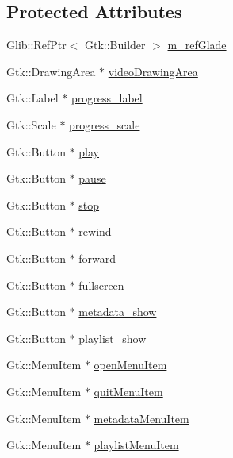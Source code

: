 \subsection*{Protected Attributes}
\begin{DoxyCompactItemize}
\item 
Glib\-::\-Ref\-Ptr$<$ Gtk\-::\-Builder $>$ \hyperlink{classplayerWindow_aec50c582b518c3ec9c4c86dde1a94127}{m\-\_\-ref\-Glade}
\item 
Gtk\-::\-Drawing\-Area $\ast$ \hyperlink{classplayerWindow_a86cf18b2dd54a8b7c48d012134dc2947}{video\-Drawing\-Area}
\item 
Gtk\-::\-Label $\ast$ \hyperlink{classplayerWindow_ae276969a34d7a21553c23ae17ca76eca}{progress\-\_\-label}
\item 
Gtk\-::\-Scale $\ast$ \hyperlink{classplayerWindow_a295a659d7e32496d0fc278afeed2f7d1}{progress\-\_\-scale}
\item 
Gtk\-::\-Button $\ast$ \hyperlink{classplayerWindow_a81cfbb843e2371f1b9bfb8c05dd4b56b}{play}
\item 
Gtk\-::\-Button $\ast$ \hyperlink{classplayerWindow_aeb53d8b331ccfaba331014ff31906900}{pause}
\item 
Gtk\-::\-Button $\ast$ \hyperlink{classplayerWindow_a45301ae61e21b660c836900e8c0155f6}{stop}
\item 
Gtk\-::\-Button $\ast$ \hyperlink{classplayerWindow_aa32c5da9a017455284386fdc32ab82b4}{rewind}
\item 
Gtk\-::\-Button $\ast$ \hyperlink{classplayerWindow_acbb28791ab52cec384ca908fb2574260}{forward}
\item 
Gtk\-::\-Button $\ast$ \hyperlink{classplayerWindow_a3da94085afe63001f55c12338710fa2c}{fullscreen}
\item 
Gtk\-::\-Button $\ast$ \hyperlink{classplayerWindow_a4d2470ce86d3ec380fd0cb4aac3a7ae8}{metadata\-\_\-show}
\item 
Gtk\-::\-Button $\ast$ \hyperlink{classplayerWindow_a6eb8371f71ff2dd2b9e6df87577b5c3f}{playlist\-\_\-show}
\item 
Gtk\-::\-Menu\-Item $\ast$ \hyperlink{classplayerWindow_a01aafd36eea007874231bfac245dd21d}{open\-Menu\-Item}
\item 
Gtk\-::\-Menu\-Item $\ast$ \hyperlink{classplayerWindow_a8b0c945e5b9aa8c33f1eaaa1a53f79bc}{quit\-Menu\-Item}
\item 
Gtk\-::\-Menu\-Item $\ast$ \hyperlink{classplayerWindow_af62ee9d8e38215b77a741f47c96d2d2c}{metadata\-Menu\-Item}
\item 
Gtk\-::\-Menu\-Item $\ast$ \hyperlink{classplayerWindow_a816eae21397d60d898fcc8aa53424b5d}{playlist\-Menu\-Item}

\end{DoxyCompactItemize}
